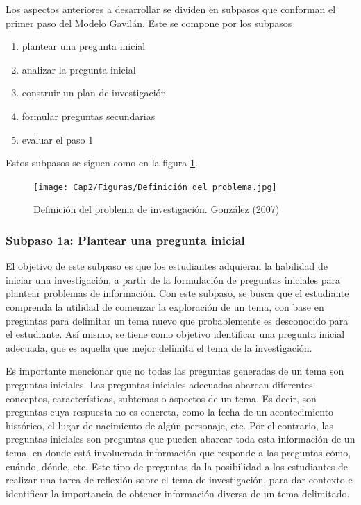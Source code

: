 Los aspectos anteriores a desarrollar se dividen en subpasos que conforman el primer paso del Modelo Gavilán. Este se compone por los subpasos

\begin{enumerate}
  \item plantear una pregunta inicial
  \item analizar la pregunta inicial
  \item construir un plan de investigación
  \item formular preguntas secundarias
  \item evaluar el paso 1
\end{enumerate}

Estos subpasos se siguen como en la figura \ref{fig:23}.

\begin{figure}[H]
  \centering
  \texttt{[image: Cap2/Figuras/Definición del problema.jpg]}
  \caption{Definición del problema de investigación. González (2007)}
  \label{fig:23}
\end{figure}


\subsubsection{Subpaso 1a: Plantear una pregunta inicial}
\label{secPaso1aCap2}

El objetivo de este subpaso es que los estudiantes adquieran la habilidad de iniciar una investigación, a partir de la formulación de preguntas iniciales para plantear problemas de información. Con este subpaso, se busca que el estudiante comprenda la utilidad de comenzar la exploración de un tema, con base en preguntas para delimitar un tema nuevo que probablemente es desconocido para el estudiante. Así mismo, se tiene como objetivo identificar una pregunta inicial adecuada, que es aquella que mejor delimita el tema de la investigación.

Es importante mencionar que no todas las preguntas generadas de un tema son preguntas iniciales. Las preguntas iniciales adecuadas abarcan diferentes conceptos, características, subtemas o aspectos de un tema. Es decir, son preguntas cuya respuesta no es concreta, como la fecha de un acontecimiento histórico, el lugar de nacimiento de algún personaje, etc. Por el contrario, las preguntas iniciales son preguntas que pueden abarcar toda esta información de un tema, en donde está involucrada información que responde a las preguntas cómo, cuándo, dónde, etc. Este tipo de preguntas da la posibilidad a los estudiantes de realizar una tarea de reflexión sobre el tema de investigación, para dar contexto e identificar la importancia de obtener información diversa de un tema delimitado.

